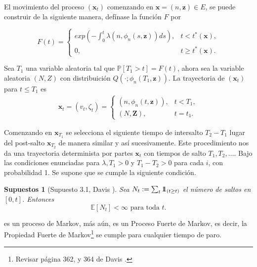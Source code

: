 \documentclass{article}
\newtheorem{Sup}{Supuestos}[section]
\newcommand{\esp}{\mathbb{E}}
\newcommand{\prob}{\mathbb{P}}
\newcommand{\indora}{\mbox{$1$\hspace{-0.8ex}$1$}}
\numberwithin{equation}{section}
\begin{document}
El movimiento del proceso $\left(\mathbf{x}_{t}\right)$ comenzando en $\mathbf{x}=\left(n,\mathbf{z}\right)\in E$, se puede construir de la siguiente manera, def\'inase la funci\'on $F$ por

\begin{equation}
F\left(t\right)=\left\{\begin{array}{ll}
exp\left(-\int_{0}^{t}\lambda\left(n,\phi_{n}\left(s,\mathbf{z}\right)\right)ds\right), & t<t^{*}\left(\mathbf{x}\right),\\
0, & t\geq t^{*}\left(\mathbf{x}\right).
\end{array}\right.
\end{equation}

Sea $T_{1}$ una variable aleatoria tal que $\prob\left[T_{1}>t\right]=F\left(t\right)$, ahora sea la variable aleatoria $\left(N,Z\right)$ con distribuici\'on $Q\left(\cdot;\phi_{n}\left(T_{1},\mathbf{z}\right)\right)$. La trayectoria de $\left(\mathbf{x}_{t}\right)$ para $t\leq T_{1}$ es
\begin{eqnarray*}
\mathbf{x}_{t}=\left(v_{t},\zeta_{t}\right)=\left\{\begin{array}{ll}
\left(n,\phi_{n}\left(t,\mathbf{z}\right)\right), & t<T_{1},\\
\left(N,\mathbf{Z}\right), & t=t_{1}.
\end{array}\right.
\end{eqnarray*}

Comenzando en $\mathbf{x}_{T_{1}}$ se selecciona el siguiente tiempo de intersalto $T_{2}-T_{1}$ lugar del post-salto $\mathbf{x}_{T_{2}}$ de manera similar y as\'i sucesivamente. Este procedimiento nos da una trayectoria determinista por partes $\mathbf{x}_{t}$ con tiempos de salto $T_{1},T_{2},\ldots$. Bajo las condiciones enunciadas para $\lambda,T_{1}>0$  y $T_{1}-T_{2}>0$ para cada $i$, con probabilidad 1. Se supone que se cumple la siguiente condici\'on.

\begin{Sup}[Supuesto 3.1, Davis \cite{Davis}]\label{Sup3.1.Davis}
Sea $N_{t}:=\sum_{t}\indora_{\left(t\geq t\right)}$ el n\'umero de saltos en $\left[0,t\right]$. Entonces
\begin{equation}
\esp\left[N_{t}\right]<\infty\textrm{ para toda }t.
\end{equation}
\end{Sup}

es un proceso de Markov, m\'as a\'un, es un Proceso Fuerte de Markov, es decir, la Propiedad Fuerte de Markov\footnote{Revisar p\'agina 362, y 364 de Davis \cite{Davis}.} se cumple para cualquier tiempo de paro.
\end{document}
